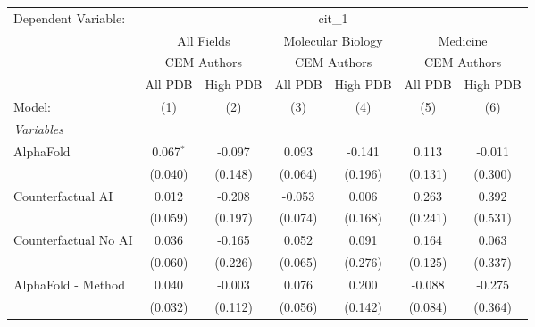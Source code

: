 \begingroup
\centering
\begin{tabular}{lcccccc}
   \tabularnewline \midrule \midrule
   Dependent Variable: & \multicolumn{6}{c}{cit\_1}\\
 & \multicolumn{2}{c}{All Fields} & \multicolumn{2}{c}{Molecular Biology} & \multicolumn{2}{c}{Medicine} \\
\cmidrule(lr){2-3} \cmidrule(lr){4-5} \cmidrule(lr){6-7}
 & \multicolumn{2}{c}{CEM Authors} & \multicolumn{2}{c}{CEM Authors} & \multicolumn{2}{c}{CEM Authors} \\
\cmidrule(lr){2-3} \cmidrule(lr){4-5} \cmidrule(lr){6-7}
 & \multicolumn{1}{c}{All PDB} & \multicolumn{1}{c}{High PDB} & \multicolumn{1}{c}{All PDB} & \multicolumn{1}{c}{High PDB} & \multicolumn{1}{c}{All PDB} & \multicolumn{1}{c}{High PDB} \\
\cmidrule(lr){2-2} \cmidrule(lr){3-3} \cmidrule(lr){4-4} \cmidrule(lr){5-5} \cmidrule(lr){6-6} \cmidrule(lr){7-7}
   Model:                                                     & (1)         & (2)          & (3)     & (4)            & (5)          & (6)\\  
   \midrule
   \emph{Variables}\\
   AlphaFold                                                  & 0.067$^{*}$ & -0.097       & 0.093   & -0.141         & 0.113        & -0.011\\   
                                                              & (0.040)     & (0.148)      & (0.064) & (0.196)        & (0.131)      & (0.300)\\   
   Counterfactual AI                                          & 0.012       & -0.208       & -0.053  & 0.006          & 0.263        & 0.392\\   
                                                              & (0.059)     & (0.197)      & (0.074) & (0.168)        & (0.241)      & (0.531)\\   
   Counterfactual No AI                                       & 0.036       & -0.165       & 0.052   & 0.091          & 0.164        & 0.063\\   
                                                              & (0.060)     & (0.226)      & (0.065) & (0.276)        & (0.125)      & (0.337)\\   
   AlphaFold - Method                                         & 0.040       & -0.003       & 0.076   & 0.200          & -0.088       & -0.275\\   
                                                              & (0.032)     & (0.112)      & (0.056) & (0.142)        & (0.084)      & (0.364)\\   

\end{tabular}
